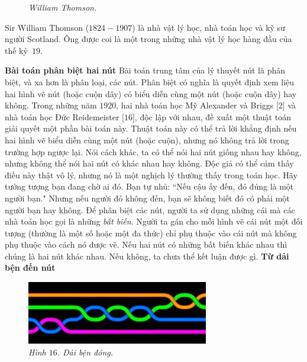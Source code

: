 \begin{multicols}{2}
{\begin{figure}[H]
		\caption{\small\textit{\color{duongvaotoanhoc}William Thomson.}}
		\vspace*{-10pt}
	\end{figure}
	Sir William Thomson ($1824-1907$) là nhà vật lý học, nhà toán học và kỹ sư người Scotland. Ông được coi là một trong những nhà vật lý học hàng đầu của thế kỷ~$19$.
	}
	\vskip 0.1cm
	\textbf{\color{duongvaotoanhoc}Bài toán phân biệt hai nút}
	\vskip 0.1cm
	Bài toán trung tâm của lý thuyết nút là phân biệt, và xa hơn là phân loại, các nút. Phân biệt có nghĩa là quyết định xem liệu hai hình vẽ nút (hoặc cuộn dây) có biểu diễn cùng một nút (hoặc cuộn dây) hay không. Trong những năm $1920$, hai nhà toán học Mỹ Alexander và Briggs [$2$] và nhà toán học Đức Reidemeister [$16$], độc lập với nhau, đề xuất một thuật toán giải quyết một phần bài toán này. Thuật toán này có thể trả lời khẳng định nếu hai hình vẽ biểu diễn cùng một nút (hoặc cuộn), nhưng nó không trả lời trong trường hợp ngược lại. Nói cách khác, ta có thể nói hai nút giống nhau hay không, nhưng không thể nói hai nút có khác nhau hay không. Độc giả có thể cảm thấy điều này thật vô lý, nhưng nó là một nghịch lý thường thấy trong toán học. Hãy tưởng tượng bạn đang chờ ai đó. Bạn tự nhủ: ``Nếu cậu ấy đến, đó đúng là một người bạn." Nhưng nếu người đó không đến, bạn sẽ không biết đó có phải một người bạn hay không.
	\vskip 0.05cm
	Để phân biệt các nút, người ta sử dụng những cái mà các nhà toán học gọi là những \textit{bất biến}. Người ta gán cho mỗi hình vẽ cái nút một đối tượng (thường là một số hoặc một đa thức) chỉ phụ thuộc vào cái nút mà không phụ thuộc vào cách nó được vẽ. Nếu hai nút có những bất biến khác nhau thì chúng là hai nút khác nhau. Nếu không, ta chưa thể kết luận được gì.
	\vskip 0.1cm
	\textbf{\color{duongvaotoanhoc}Từ dải bện đến nút}
	\begin{figure}[H]
		\vspace*{-10pt}
		\centering
		\captionsetup{labelformat= empty, justification=centering}
		\includegraphics[width= 1\linewidth]{fig_16}
		\caption{\small\textit{\color{duongvaotoanhoc}Hình $16$. Dải bện đóng.}}
		\vspace*{-10pt}

\end{figure}
\end{multicols}
